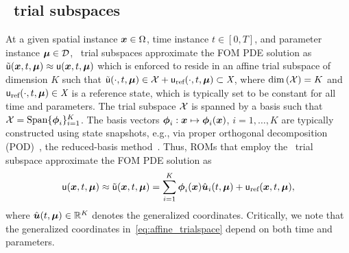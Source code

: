 \documentclass[3p,computermodern,10pt]{elsarticle}
\begin{document}
\subsection{\spatialAcronym\ trial subspaces}
At a given spatial instance $\boldsymbol x \in \Omega$, time instance 
$t\in[0,T]$, and parameter instance $\boldsymbol \mu \in \mathcal{D}$,
\spatialAcronym\ trial subspaces approximate the FOM PDE solution
as $\tilde{\mathsf{u}}(\boldsymbol x, t,\boldsymbol \mu) \approx \mathsf{u}(\boldsymbol x, t,\boldsymbol \mu)$ which is enforced to reside in an affine 
trial subspace of dimension $K$ such that 
$\tilde{\mathsf{u}}(\cdot,t,\boldsymbol \mu) \in \mathcal{X} + \mathsf{u}_{\text{ref}}(\cdot,t,\boldsymbol \mu) \subset \textit{X}$, where $\dim{(\mathcal{X})} = K$ and 
$\mathsf{u}_{\text{ref}}(\cdot,t,\boldsymbol \mu) \in \textit{X}$ is a reference state, which is typically set to be constant for all time and parameters. 
The trial subspace
$\mathcal{X}$ 
is spanned by a basis such that
$ \mathcal{X}= \text{Span}\{\boldsymbol \phi_i\}_{i=1}^{K}$.
The basis vectors $\boldsymbol \phi_i: \boldsymbol x \mapsto \boldsymbol \phi_i(\boldsymbol x)$, $i=1,\ldots,K$ are typically constructed
using state snapshots, e.g., via
proper orthogonal decomposition (POD)~\cite{berkooz_turbulence_pod}, the reduced-basis method~\cite{rb_1,rb_2,rb_3,NgocCuong2005,Rozza2008}. 
Thus, ROMs that employ the  \spatialAcronym\
trial subspace approximate the FOM PDE solution as
\begin{equation}\label{eq:affine_trialspace}
\mathsf{u}(\boldsymbol x, t,\boldsymbol \mu)  \approx \tilde{\mathsf{u}}(\boldsymbol x, t,\boldsymbol \mu) = \sum_{i=1}^{K} \boldsymbol \phi_i(\boldsymbol x) \hat{\boldsymbol u}_i(t,\boldsymbol \mu) + \mathsf{u}_{\text{ref}}(\boldsymbol x,t,\boldsymbol \mu),
\end{equation}
where $\hat{\boldsymbol u}(t,\boldsymbol \mu) \in \mathbb{R}^{K}$ denotes the generalized
coordinates. Critically, we note that the generalized coordinates in~\eqref{eq:affine_trialspace} depend on both time and parameters.
\end{document}
